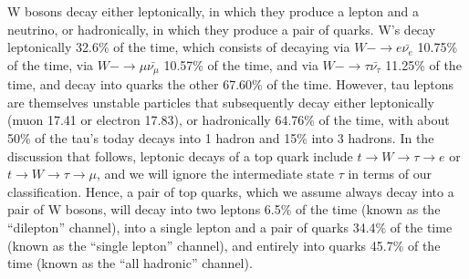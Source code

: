 W bosons decay either leptonically, in which they produce a lepton and a neutrino, or hadronically, in which they produce a pair of quarks.
W's decay leptonically 32.6\% of the time, which consists of decaying via $W- \rightarrow e \bar{\nu_{e}}$ 10.75\% of the time, 
via $W- \rightarrow \mu \bar{\nu_{\mu}}$ 10.57\% of the time, and via $W- \rightarrow \tau \bar{\nu_{\tau}}$ 11.25\% of the time, 
and decay into quarks the other 67.60\% of the time. \cite{PARTICLE_DATA_GROUP}
However, tau leptons are themselves unstable particles that subsequently decay either leptonically (muon 17.41 or electron 17.83), or hadronically 64.76\% of the time, with about 50\% of the tau's today decays into 1 hadron and 15\% into 3 hadrons.
In the discussion that follows, leptonic decays of a top quark include $t \rightarrow W \rightarrow \tau \rightarrow e$ or $t \rightarrow W \rightarrow \tau \rightarrow \mu$, and we will ignore the intermediate state $\tau$ in terms of our classification.
Hence, a pair of top quarks, which we assume always decay into a pair of W bosons, will decay into two leptons 6.5\% of the time (known as the ``dilepton'' channel), into a single lepton and a pair of quarks 34.4\% of the time (known as the ``single lepton'' channel), and entirely into quarks 45.7\% of the time (known as the ``all hadronic'' channel).





